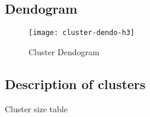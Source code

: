 \begin{landscape}

\subsection{Dendogram}%
\label{sub:dendogram}


\begin{figure}[H]
    \centering
    \texttt{[image: cluster-dendo-h3]}
    \caption{Cluster Dendogram}%
    \label{fig:dendogram}
\end{figure}

\end{landscape}



\subsection{Description of clusters}%
\label{sub:description_of_clusters}

\begin{table}[H]
\centering
\caption{Cluster size table}%
\label{tab:cluster_size}

\end{table}


